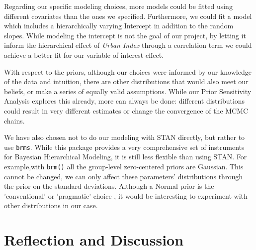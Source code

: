 \documentclass[12pt]{article}
\newcommand{\blue}[1]{\textcolor{blue}{#1}}
\begin{document}
Regarding our specific modeling choices, more models could be fitted using different covariates than the ones we specified. Furthermore, we could fit a model which includes a hierarchically varying Intercept in addition to the random slopes. While modeling the intercept is not the goal of our project, by letting it inform the hierarchical effect of \textit{Urban Index} through a correlation term we could achieve a better fit for our variable of interest effect.


With respect to the priors, although our choices were informed by our knowledge of the data and intuition, there are other distributions that would also meet our beliefs, or make a series of equally valid assumptions. While our Prior Sensitivity Analysis explores this already, more can always be done: different distributions could result in very different estimates or change the convergence of the MCMC chains. 


We have also chosen not to do our modeling with STAN directly, but rather to use \verb|brms|. While this package provides a very comprehensive set of instruments for Bayesian Hierarchical Modeling, it is still less flexible than using STAN. For example,with \verb|brm()| all the group-level zero-centered priors are Gaussian. This cannot be changed, we can only affect these parameters' distributions through the prior on the standard deviations. Although a Normal prior is the 'conventional' or 'pragmatic' choice \parencite{mcelreath2016statistical}, it would be interesting to experiment with other distributions in our case.


\section{Reflection and Discussion}
\end{document}
